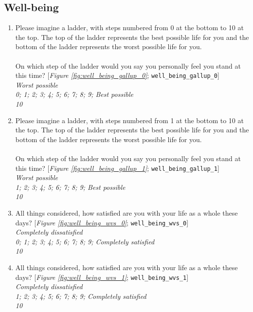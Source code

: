  \subsection*{Well-being} 
 \begin{enumerate}[resume] 
\item  \label{q:well_being_gallup_0} Please imagine a ladder, with steps numbered from 0 at the bottom to 10 at the top. The top of the ladder represents the best possible life for you and the bottom of the ladder represents the worst possible life for you. \\\\On which step of the ladder would you say you personally feel you stand at this time? [\textit{Figure \ref{fig:well_being_gallup_0}}; 
\verb|well_being_gallup_0|]
  \\ \textit{Worst possible\\0; 1; 2; 3; 4; 5; 6; 7; 8; 9; Best possible\\10}

\item  \label{q:well_being_gallup_1} Please imagine a ladder, with steps numbered from 1 at the bottom to 10 at the top. The top of the ladder represents the best possible life for you and the bottom of the ladder represents the worst possible life for you. \\\\On which step of the ladder would you say you personally feel you stand at this time? [\textit{Figure \ref{fig:well_being_gallup_1}}; 
\verb|well_being_gallup_1|]
  \\ \textit{Worst possible\\1; 2; 3; 4; 5; 6; 7; 8; 9; Best possible\\10}

\item  \label{q:well_being_wvs_0} All things considered, how satisfied are you with your life as a whole these days? [\textit{Figure \ref{fig:well_being_wvs_0}}; 
\verb|well_being_wvs_0|]
  \\ \textit{Completely dissatisfied\\0; 1; 2; 3; 4; 5; 6; 7; 8; 9; Completely satisfied\\10}

\item  \label{q:well_being_wvs_1} All things considered, how satisfied are you with your life as a whole these days? [\textit{Figure \ref{fig:well_being_wvs_1}}; 
\verb|well_being_wvs_1|]
  \\ \textit{Completely dissatisfied\\1; 2; 3; 4; 5; 6; 7; 8; 9; Completely satisfied\\10}

\end{enumerate} 

